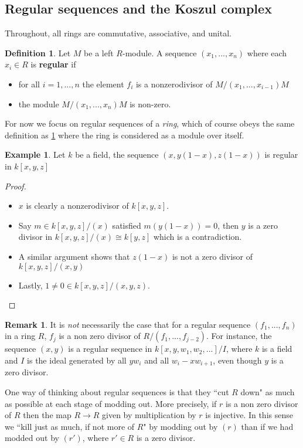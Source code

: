 \documentclass[12pt]{article}
\theoremstyle{plain}
\theoremstyle{definition}
\newtheorem{defn}[thm]{Definition} %
\newtheorem{remark}[thm]{Remark}
\newtheorem{example}[thm]{Example}
\begin{document}
\subsection{Regular sequences and the Koszul complex}
Throughout, all rings are commutative, associative, and unital.
\begin{defn}\label{def:regular_sequence}
	Let $M$ be a left $R$-module. A sequence $(x_1,...,x_n)$ where each $x_i \in R$ is \textbf{regular} if
	\begin{itemize}
		\item for all $i = 1,...,n$ the element $f_i$ is a nonzerodivisor of $M/(x_1,...,x_{i-1})M$
		\item the module $M/(x_1,...,x_n)M$ is non-zero.
	\end{itemize}
\end{defn}
For now we focus on regular sequences of a \emph{ring}, which of course obeys the same definition as \ref{def:regular_sequence} where the ring is considered as a module over itself.
\begin{example}
	Let $k$ be a field, the sequence $(x,y(1-x),z(1-x))$ is regular in $k[x,y,z]$
\end{example}
\begin{proof}
	\begin{itemize}
		\item $x$ is clearly a nonzerodivisor of $k[x,y,z]$.
		\item Say $m \in k[x,y,z]/(x)$ satisfied $m(y(1-x)) = 0$, then $y$ is a zero divisor in $k[x,y,z]/(x) \cong k[y,z]$ which is a contradiction.
		\item A similar argument shows that $z(1-x)$ is not a zero divisor of $k[x,y,z]/(x,y)$
		\item Lastly, $1 \neq 0 \in k[x,y,z]/(x,y,z)$.
	\end{itemize}
\end{proof}
\begin{remark}
	It is \emph{not} necessarily the case that for a regular sequence $(f_1,...,f_n)$ in a ring $R$, $f_j$ is a non zero divisor of $R/(f_1,...,f_{j-2})$. For instance, the sequence $(x,y)$ is a regular sequence in $k[x,y,w_1,w_2,...]/I$, where $k$ is a field and $I$ is the ideal generated by all $yw_i$ and all $w_i - xw_{i+1}$, even though $y$ is a zero divisor.
\end{remark}
One way of thinking about regular sequences is that they ``cut $R$ down" as much as possible at each stage of modding out. More precisely, if $r$ is a non zero divisor of $R$ then the map $R \to R$ given by multiplication by $r$ is injective. In this sense we ``kill just as much, if not more of $R$" by modding out by $(r)$ than if we had modded out by $(r')$, where $r' \in R$ is a zero divisor.
\end{document}

